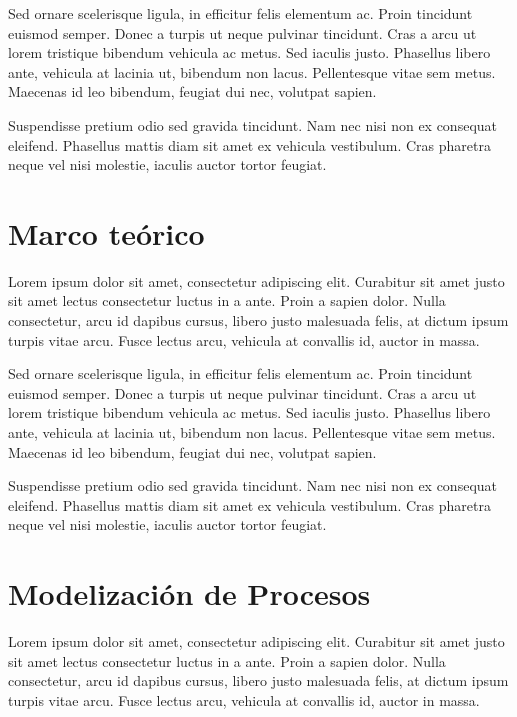 \documentclass[conference]{IEEEtran}
\begin{document}
Sed ornare scelerisque ligula, in efficitur felis elementum ac. Proin tincidunt euismod semper. Donec a turpis ut neque pulvinar tincidunt. Cras a arcu ut lorem tristique bibendum vehicula ac metus. Sed iaculis justo. Phasellus libero ante, vehicula at lacinia ut, bibendum non lacus. Pellentesque vitae sem metus. Maecenas id leo bibendum, feugiat dui nec, volutpat sapien.
 
Suspendisse pretium odio sed gravida tincidunt. Nam nec nisi non ex consequat eleifend. Phasellus mattis diam sit amet ex vehicula vestibulum. Cras pharetra neque vel nisi molestie, iaculis auctor tortor feugiat.


\section{Marco teórico}
\label{sec:objetivo}

Lorem ipsum dolor sit amet, consectetur adipiscing elit. Curabitur sit amet justo sit amet lectus consectetur luctus in a ante. Proin a sapien dolor. Nulla consectetur, arcu id dapibus cursus, libero justo malesuada felis, at dictum ipsum turpis vitae arcu. Fusce lectus arcu, vehicula at convallis id, auctor in massa.

Sed ornare scelerisque ligula, in efficitur felis elementum ac. Proin tincidunt euismod semper. Donec a turpis ut neque pulvinar tincidunt. Cras a arcu ut lorem tristique bibendum vehicula ac metus. Sed iaculis justo. Phasellus libero ante, vehicula at lacinia ut, bibendum non lacus. Pellentesque vitae sem metus. Maecenas id leo bibendum, feugiat dui nec, volutpat sapien.
 
Suspendisse pretium odio sed gravida tincidunt. Nam nec nisi non ex consequat eleifend. Phasellus mattis diam sit amet ex vehicula vestibulum. Cras pharetra neque vel nisi molestie, iaculis auctor tortor feugiat.



\section{Modelización de Procesos}
\label{sec:modelizacion}

Lorem ipsum dolor sit amet, consectetur adipiscing elit. Curabitur sit amet justo sit amet lectus consectetur luctus in a ante. Proin a sapien dolor. Nulla consectetur, arcu id dapibus cursus, libero justo malesuada felis, at dictum ipsum turpis vitae arcu. Fusce lectus arcu, vehicula at convallis id, auctor in massa.
\end{document}
